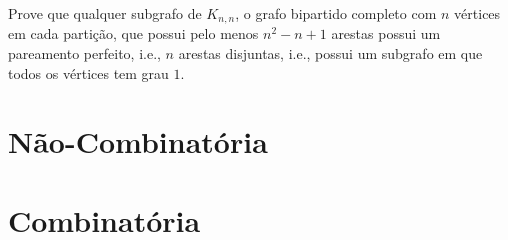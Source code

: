 \documentclass[10pt,a4paper]{article}
\begin{document}
	\begin{prob}
		Prove que qualquer subgrafo de $K_{n,n}$, o grafo bipartido completo com $n$ vértices em cada partição, que possui pelo menos $n^2 - n+1$ arestas possui um pareamento perfeito, i.e., $n$ arestas disjuntas, i.e., possui um subgrafo em que todos os vértices tem grau $1$.
	\end{prob}
	
	\newpage

	\section{Não-Combinatória}

	
	\section{Combinatória}
	
\end{document}
